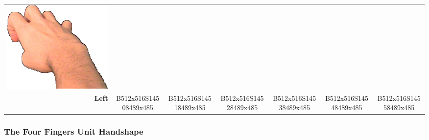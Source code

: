 \documentclass{article}
\begin{document}
\begin{center}
\begin{tabular}{r*{6}{c}}
\includegraphics[scale=0.1]{images/04-02-6.jpg}\\
\textbf{Left}&
B512x516S14508489x485&
B512x516S14518489x485&
B512x516S14528489x485&
B512x516S14538489x485&
B512x516S14548489x485&
B512x516S14558489x485\\
\end{tabular}
\end{center}

\subsubsection{The Four Fingers Unit Handshape}
\end{document}
